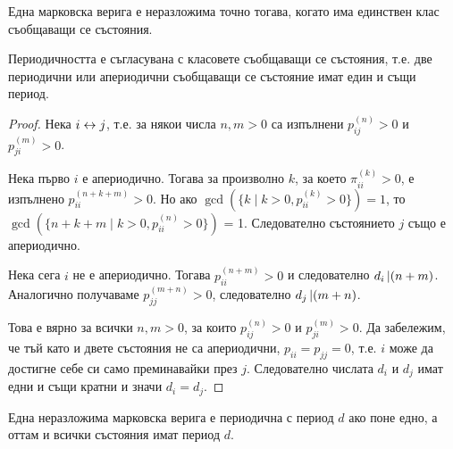 \documentclass[numbers=endperiod, DIV=15, bibliography=totocnumbered]{scrartcl}
\begin{document}
\begin{corollary}
  Една марковска верига е неразложима точно тогава, когато има единствен клас съобщаващи се състояния.
\end{corollary}

\begin{proposition}
  Периодичността е съгласувана с класовете съобщаващи се състояния, т.е. две периодични или апериодични съобщаващи се състояние имат един и същи период.
\end{proposition}
\begin{proof}
  Нека $i \leftrightarrow j$, т.е. за някои числа $n, m > 0$ са изпълнени $p_{ij}^{(n)} > 0$ и $p_{ji}^{(m)} > 0$.

  Нека първо $i$ е апериодично. Тогава за произволно $k$, за което $\pi_{ii}^{(k)} > 0$, е изпълнено $p_{ii}^{(n+k+m)} > 0$. Но ако $\gcd (\{ k \mid k > 0, p_{ii}^{(k)} > 0 \}) = 1$, то $\gcd (\{ n+k+m \mid k > 0, p_{ii}^{(n)} > 0 \})$ = 1. Следователно състоянието $j$ също е апериодично.

  Нека сега $i$ не е апериодично. Тогава $p_{ii}^{(n+m)} > 0$ и следователно $d_i \operatorname{\vert} (n+m)$. Аналогично получаваме $p_{jj}^{(m+n)} > 0$, следователно $d_j \operatorname{\vert} (m+n)$.

  Това е вярно за всички $n, m > 0$, за които $p_{ij}^{(n)} > 0$ и $p_{ji}^{(m)} > 0$. Да забележим, че тъй като и двете състояния не са апериодични, $p_{ii} = p_{jj} = 0$, т.е. $i$ може да достигне себе си само преминавайки през $j$. Следователно числата $d_i$ и $d_j$ имат едни и същи кратни и значи $d_i = d_j$.
\end{proof}

\begin{corollary}
  Една неразложима марковска верига е периодична с период $d$ ако поне едно, а оттам и всички състояния имат период $d$.
\end{corollary}
\end{document}
